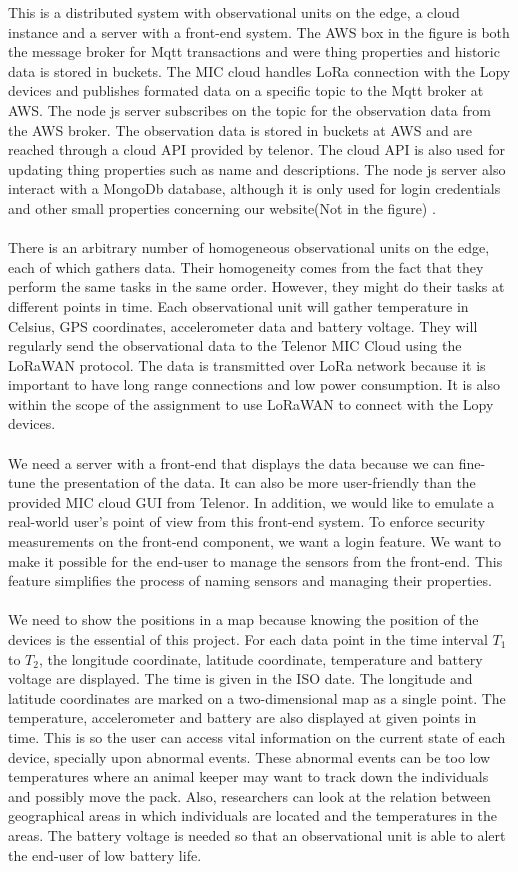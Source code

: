 		This is a distributed system with observational units on the edge, a cloud instance and a server with a front-end system. The AWS box in the figure is both the message broker for Mqtt transactions and were thing properties and historic data is stored in buckets. The MIC cloud handles LoRa connection with the Lopy devices and publishes formated data on a specific topic to the Mqtt broker at AWS. The node js server subscribes on the topic for the observation data from the AWS broker. The observation data is stored in buckets at AWS and are reached through a cloud API provided by telenor. The cloud API is also used for updating thing properties such as name and descriptions. The node js server also interact with a MongoDb database, although it is only used for login credentials and other small properties concerning our website(Not in the figure) . 
		\\\\
		There is an arbitrary number of homogeneous observational units on the edge, each of which gathers data. Their homogeneity comes from the fact that they perform the same tasks in the same order. However, they might do their tasks at different points in time. Each observational unit will gather temperature in Celsius, GPS coordinates, accelerometer data and battery voltage. They will regularly send the observational data to the Telenor MIC Cloud using the LoRaWAN protocol. The data is transmitted over LoRa network because it is important to have long range connections and low power consumption. It is also within the scope of the assignment to use LoRaWAN to connect with the Lopy devices.  
		\\\\
		We need a server with a front-end that displays the data because we can fine-tune the presentation of the data. It can also be more user-friendly than the provided MIC cloud GUI from Telenor. In addition, we would like to emulate a real-world user’s point of view from this front-end system. To enforce security measurements on the front-end component, we want a login feature. We want to make it possible for the end-user to manage the sensors from the front-end. This feature simplifies the process of naming sensors and managing their properties. 	
		\\\\
		We need to show the positions in a map because knowing the position of the devices is the essential of this project. For each data point in the time interval $T_1$ to $T_2$, the longitude coordinate, latitude coordinate, temperature and battery voltage are displayed. The time is given in the ISO date. The longitude and latitude coordinates are marked on a two-dimensional map as a single point. The temperature, accelerometer and battery are also displayed at given points in time. This is so the user can access vital information on the current state of each device, specially upon abnormal events. These abnormal events can be too low temperatures where an animal keeper may want to track down the individuals and possibly move the pack. Also, researchers can look at the relation between geographical areas in which individuals are located and the temperatures in the areas. The battery voltage is needed so that an observational unit is able to alert the end-user of low battery life.  	
